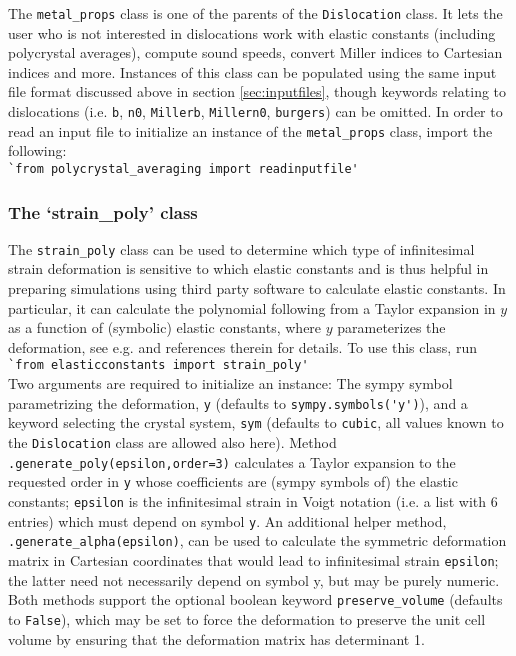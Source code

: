 \documentclass[11pt,letterpaper,oneside,pdftex]{article}
\begin{document}
The \verb|metal_props| class is one of the parents of the \verb|Dislocation| class.
It lets the user who is not interested in dislocations work with elastic constants (including polycrystal averages), compute sound speeds, convert Miller indices to Cartesian indices and more.
Instances of this class can be populated using the same input file format discussed above in section \ref{sec:inputfiles}, though keywords relating to dislocations (i.e. \verb|b|, \verb|n0|, \verb|Millerb|, \verb|Millern0|, \verb|burgers|) can be omitted.
In order to read an input file to initialize an instance of the \verb|metal_props| class, import the following:
\\\verb|`from polycrystal_averaging import readinputfile'|


\subsubsection{The `strain\_poly' class}
\label{sec:strain_poly}

The \verb|strain_poly| class can be used to determine which type of infinitesimal strain deformation is sensitive to which elastic constants and is thus helpful in preparing simulations using third party software to calculate elastic constants.
In particular, it can calculate the polynomial following from a Taylor expansion in $y$ as a function of (symbolic) elastic constants, where $y$ parameterizes the deformation, see e.g. \cite{Gu:2019,Blaschke:2021temperature} and references therein for details.
To use this class, run
\\\verb|`from elasticconstants import strain_poly'|\\
Two arguments are required to initialize an instance:
The sympy symbol parametrizing the deformation, \verb|y| (defaults to \verb|sympy.symbols('y')|), and a keyword selecting the crystal system, \verb|sym| (defaults to \verb|cubic|, all values known to the \verb|Dislocation| class are allowed also here).
Method \verb|.generate_poly(epsilon,order=3)| calculates a Taylor expansion to the requested order in \verb|y| whose coefficients are (sympy symbols of) the elastic constants; \verb|epsilon| is the infinitesimal strain in Voigt notation (i.e. a list with 6 entries) which must depend on symbol \verb|y|.
An additional helper method, \verb|.generate_alpha(epsilon)|, can be used to calculate the symmetric deformation matrix in Cartesian coordinates that would lead to infinitesimal strain \verb|epsilon|;
the latter need not necessarily depend on symbol y, but may be purely numeric.
Both methods support the optional boolean keyword \verb|preserve_volume| (defaults to \verb|False|), which may be set to force the deformation to preserve the unit cell volume by ensuring that the deformation matrix has determinant 1.
\end{document}
